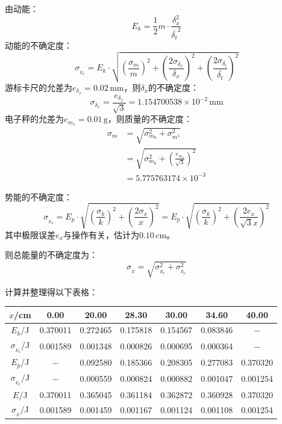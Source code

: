 \documentclass[a4paper,fontset=windows]{ctexart}
\begin{document}
由动能：
\[
    E_k = \frac{1}{2}m\cdot\frac{\delta_x^2}{\overline{\delta_t}^2}
\]
动能的不确定度：
\[
    \sigma_{_{E_k}} = E_k\cdot\sqrt{\left(\frac{\sigma_m}{m}\right)^2 + \left(\frac{2\sigma_{\delta_x}}{\delta_x}\right)^2 + \left(\frac{2\sigma_{\overline{\delta_t}}}{\overline{\delta_t}}\right)^2}
\]
游标卡尺的允差为$e_{\delta_x} = 0.02\,\mathrm{mm}$，则$\delta_x$的不确定度：
\[
    \sigma_{\delta_x} = \frac{e_{\delta_x}}{\sqrt{3}} = 1.154700538\times10^{-2}\,\mathrm{mm}
\]
电子秤的允差为$e_{m_1}=0.01\,\mathrm{g}$，则质量的不确定度：
\begin{align*}
    \sigma_m
    &= \sqrt{\sigma_{m_0}^2 + \sigma_{m^1}^2} \\
    &= \sqrt{\sigma_{m_0}^2 + \left(\frac{e_{m_1}}{\sqrt{3}}\right)^2} \\
    &= 5.775763174\times10^{-3}
\end{align*}

势能的不确定度：
\[
    \sigma_{_{E_p}} = E_p\cdot\sqrt{\left(\frac{\sigma_k}{k}\right)^2 + \left(\frac{2\sigma_x}{x}\right)^2} = E_p\cdot\sqrt{\left(\frac{\sigma_k}{k}\right)^2 + \left(\frac{2e_x}{\sqrt{3}x}\right)^2}
\]
其中极限误差$e_x$与操作有关，估计为$0.10\,\mathrm{cm}$。

则总能量的不确定度为：
\[
    \sigma_{_E} = \sqrt{\sigma_{_{E_k}}^2 + \sigma_{_{E_p}}^2}
\]

计算并整理得以下表格：
\vspace{0.5em}
\begin{table}[ht!]\Large
    \begin{center}
        \begin{tabular}{ |c|c|c|c|c|c|c| }
            \hline
            $x$/cm & 0.00 & 20.00 & 28.30 & 30.00 & 34.60 & 40.00 \\
            \hline
            $E_k$/J & 0.370011 & 0.272465 & 0.175818 & 0.154567 & 0.083846 & $-$ \\
            \hline
            $\sigma_{_{E_k}}$/J & 0.001589 & 0.001348 & 0.000826 & 0.000695 & 0.000364 & $-$ \\
            \hline
            $E_p$/J & $-$ & 0.092580 & 0.185366 & 0.208305 & 0.277083 & 0.370320 \\
            \hline
            $\sigma_{_{E_p}}$/J & $-$ & 0.000559 & 0.000824 & 0.000882 & 0.001047 & 0.001254 \\
            \hline
            $E$/J & 0.370011 & 0.365045 & 0.361184 & 0.362872 & 0.360928 & 0.370320 \\
            \hline
            $\sigma_{_E}$/J & 0.001589 & 0.001459 & 0.001167 & 0.001124 & 0.001108 & 0.001254 \\
            \hline
        \end{tabular}
    \end{center}
\end{table}
\end{document}
